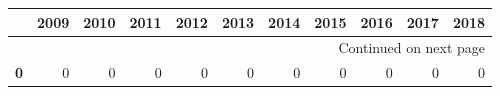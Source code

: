 \begin{longtable}{lrrrrrrrrrr}
\toprule
{} &  2009 &  2010 &  2011 &  2012 &  2013 &  2014 &  2015 &  2016 &  2017 &  2018 \\
\midrule
\endhead
\midrule
\multicolumn{11}{r}{{Continued on next page}} \\
\midrule
\endfoot

\bottomrule
\endlastfoot
\textbf{0} &     0 &     0 &     0 &     0 &     0 &     0 &     0 &     0 &     0 &     0 \\
\end{longtable}
